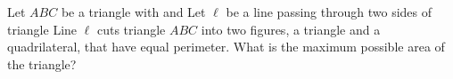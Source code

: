 Let $ABC$ be a triangle with   and  Let $\ell$ be a line passing through two sides of triangle  Line $\ell$ cuts triangle $ABC$ into two figures, a triangle and a quadrilateral, that have equal perimeter. What is the maximum possible area of the triangle?